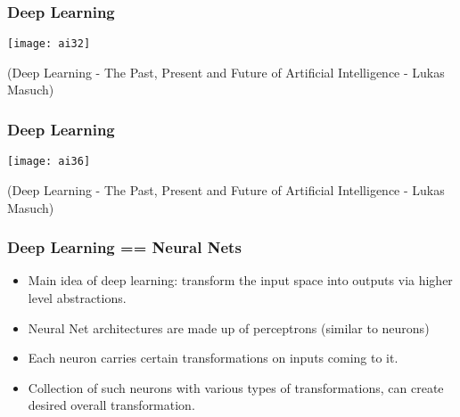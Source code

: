 \begin{frame}[fragile] \frametitle{Deep Learning}
\begin{center}
\texttt{[image: ai32]}
\end{center}
{\tiny (Deep Learning - The Past, Present and Future of Artificial Intelligence - Lukas Masuch)}
\end{frame}


\begin{frame}[fragile] \frametitle{Deep Learning}
\begin{center}
\texttt{[image: ai36]}
\end{center}
{\tiny (Deep Learning - The Past, Present and Future of Artificial Intelligence - Lukas Masuch)}
\end{frame}


\begin{frame}[fragile] \frametitle{Deep Learning == Neural Nets }

\begin{itemize}
\item Main idea of deep learning: transform the input space into outputs via higher level abstractions.
\item Neural Net architectures are made up of perceptrons (similar to neurons) 
\item Each neuron carries certain transformations on inputs coming to it.
\item Collection of such neurons with various types of transformations, can create desired overall transformation.
\end{itemize}
\end{frame}



